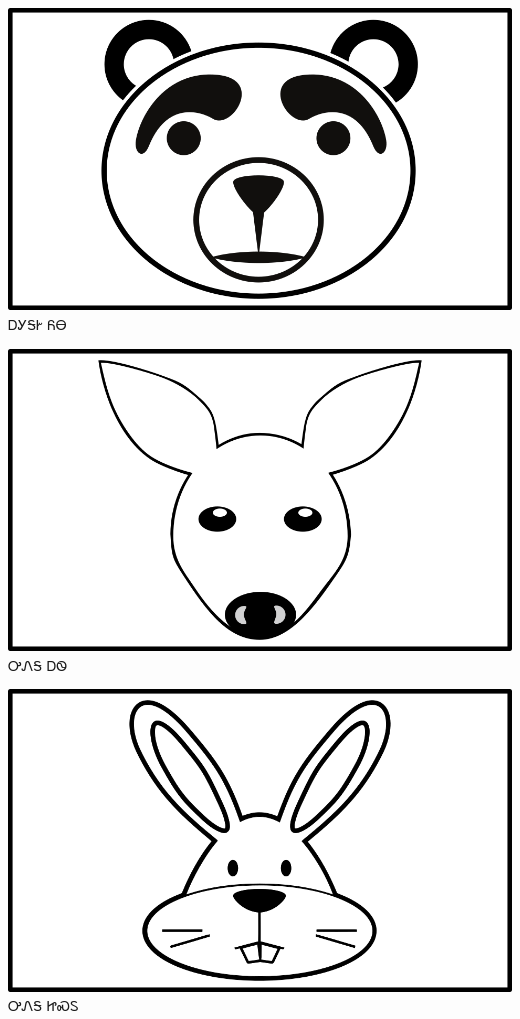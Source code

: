 \documentclass[avery5371]{flashcards}%
\begin{document}
    \begin{flashcard}{
        \includegraphics[width=0.95\columnwidth,height=.51\columnwidth,keepaspectratio]{../artwork/objects-animate/yona}
    }
        \Huge ᎠᎩᎦᎨ ᏲᎾ
    \end{flashcard}

    \begin{flashcard}{
        \includegraphics[width=0.95\columnwidth,height=.51\columnwidth,keepaspectratio]{../artwork/objects-animate/ahwi}
    }
        \Huge ᎤᏁᎦ ᎠᏫ
    \end{flashcard}

    \begin{flashcard}{
        \includegraphics[width=0.95\columnwidth,height=.51\columnwidth,keepaspectratio]{../artwork/objects-animate/jisdu}
    }
        \Huge ᎤᏁᎦ ᏥᏍᏚ
    \end{flashcard}
\end{document}
